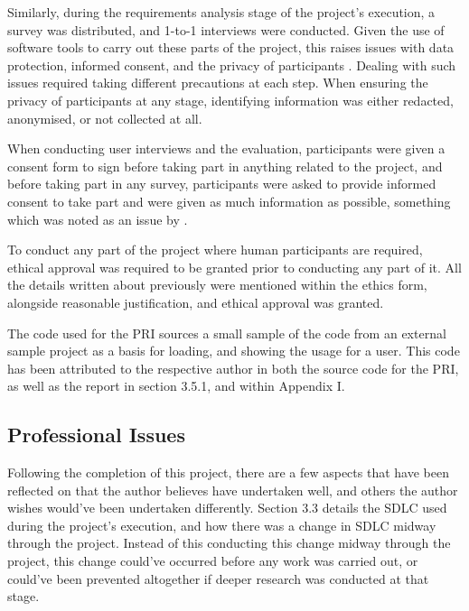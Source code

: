 \documentclass[12pt]{article}
\begin{document}
Similarly, during the requirements analysis stage of the project's execution, a survey was distributed, and 1-to-1 interviews were 
conducted. Given the use of software tools to carry out these parts of the project, this raises issues with data protection, informed 
consent, and the privacy of participants \autocite{davepregoner:hal-05073466}. Dealing with such issues required taking different precautions 
at each step. When ensuring the privacy of participants at any stage, identifying information was either redacted, anonymised, or not 
collected at all. \newline

When conducting user interviews and the evaluation, participants were given a consent form to sign before taking part in anything related 
to the project, and before taking part in any survey, participants were asked to provide informed consent to take part and were given as 
much information as possible, something which was noted as an issue by \textcite{davepregoner:hal-05073466}. \newline

To conduct any part of the project where human participants are required, ethical approval was required to be granted 
prior to conducting any part of it. All the details written about previously were mentioned within the ethics form, alongside reasonable 
justification, and ethical approval was granted.

The code used for the PRI sources a small sample of the code from an external sample project as a basis for loading, and showing the usage for
a user. This code has been attributed to the respective author in both the source code for the PRI, as well as the report in section 3.5.1, and
within Appendix I.

\subsection{Professional Issues}
Following the completion of this project, there are a few aspects that have been reflected on that the author believes have undertaken well, and
others the author wishes would've been undertaken differently. Section 3.3 details the SDLC used during the project's execution, and 
how there was a change in SDLC midway through the project. Instead of this conducting this change midway through the project, this change 
could've occurred before any work was carried out, or could've been prevented altogether if deeper research was conducted at that stage. \newline
\end{document}
